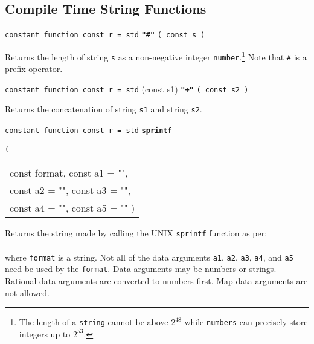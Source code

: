 \documentclass[12pt]{article}
\newcommand{\ttkey}[1]{{\tt \bfseries #1}}
\newenvironment{indpar}[1][0.3in]%
	{\begin{list}{}%
		     {\setlength{\itemsep}{0in}%
		      \setlength{\topsep}{0in}%
		      \setlength{\parsep}{1ex}%
		      \setlength{\labelwidth}{#1}%
		      \setlength{\leftmargin}{#1}%
		      \addtolength{\leftmargin}{\labelsep}}%
	 \item}%
	{\end{list}}
\begin{document}
\subsection{Compile Time String Functions}

{\tt constant function const r = std} \ttkey{"\#"} {\tt ( const s )}
\begin{indpar}
Returns the length of string {\tt s} as a non-negative integer
{\tt number}.\footnote{The length of a {\tt string} cannot
be above $2^{48}$ while
{\tt numbers} can precisely store integers up to $2^{53}$.}
Note that {\tt \#} is a prefix operator.
\end{indpar}

{\tt constant function const r = std} (const s1) \ttkey{"+"} {\tt ( const s2 )}
\begin{indpar}
Returns the concatenation of string {\tt s1}
and string {\tt s2}.
\end{indpar}

{\tt constant function const r = std} \ttkey{sprintf}
    {\tt ( \begin{tabular}[t]{@{}l}
            const format, const a1 = "", \\
	    const a2 = "", const a3 = "", \\
	    const a4 = "", const a5 = "" )
	    \end{tabular} }
\begin{indpar}
Returns the string made by calling the UNIX {\tt sprintf} function as per: \\
\hspace*{1in}{\tt sprintf ( format, a1, a2, a3, a4, a5 )} \\
where {\tt format} is a string.  Not all of the data arguments
{\tt a1}, {\tt a2}, {\tt a3}, {\tt a4}, and {\tt a5}
need be used by the {\tt format}.
Data arguments may be numbers or strings.
Rational data arguments are converted to numbers first.  Map data arguments
are not allowed.
\end{indpar}
\end{document}
